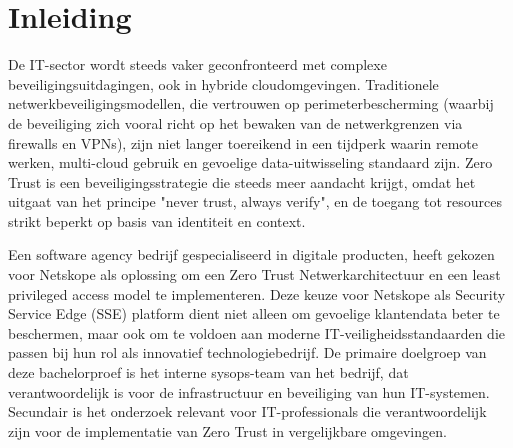 


% 

\section{Inleiding}%
\label{sec:inleiding}

De IT-sector wordt steeds vaker geconfronteerd met complexe beveiligingsuitdagingen, ook in hybride cloudomgevingen. 
Traditionele netwerkbeveiligingsmodellen, die vertrouwen op perimeterbescherming (waarbij de beveiliging zich vooral richt op het bewaken van de netwerkgrenzen via firewalls en VPNs), zijn niet langer toereikend in een tijdperk waarin remote werken, multi-cloud gebruik en gevoelige data-uitwisseling standaard zijn. 
Zero Trust is een beveiligingsstrategie die steeds meer aandacht krijgt, omdat het uitgaat van het principe "never trust, always verify", en de toegang tot resources strikt beperkt op basis van identiteit en context.

Een software agency bedrijf gespecialiseerd in digitale producten, heeft gekozen voor Netskope als oplossing om een Zero Trust Netwerkarchitectuur en een least privileged access model te implementeren. 
Deze keuze voor Netskope als Security Service Edge (SSE) platform dient niet alleen om gevoelige klantendata beter te beschermen, maar ook om te voldoen aan moderne IT-veiligheidsstandaarden die passen bij hun rol als innovatief technologiebedrijf.
De primaire doelgroep van deze bachelorproef is het interne sysops-team van het bedrijf, dat verantwoordelijk is voor de infrastructuur en beveiliging van hun IT-systemen. 
Secundair is het onderzoek relevant voor IT-professionals die verantwoordelijk zijn voor de implementatie van Zero Trust in vergelijkbare omgevingen.

